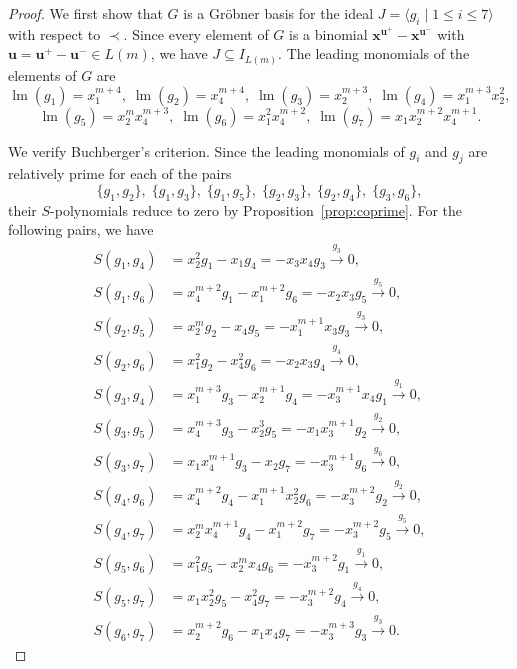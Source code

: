 \documentclass[12pt,a4paper]{amsart}
\theoremstyle{definition}
\begin{document}
\begin{proof} We first show that $G$ is a Gr\"obner basis for the ideal $J=\langle g_{i} \mid 1 \leq i \leq 7 \rangle$ with
respect to $\prec$. Since every element of $G$ is a binomial
$\mathbf x^{\mathbf u^+}-\mathbf x^{\mathbf u^-}$ with
$\mathbf u=\mathbf u^+-\mathbf u^-\in L(m)$, we have $J\subseteq I_{L(m)}$. The leading monomials of the elements of $G$ are
\[
\operatorname{lm}(g_1)=x_1^{m+4},\;
\operatorname{lm}(g_2)=x_4^{m+4},\;
\operatorname{lm}(g_3)=x_2^{m+3},\;
\operatorname{lm}(g_4)=x_1^{m+3}x_2^2, \]
\[\operatorname{lm}(g_5)=x_2^mx_4^{m+3},\;
\operatorname{lm}(g_6)=x_1^2x_4^{m+2},\;
\operatorname{lm}(g_7)=x_1x_2^{m+2}x_4^{m+1}.
\]

We verify Buchberger's criterion. Since the leading monomials of $g_i$ and $g_j$ are relatively prime for
each of the pairs
\[
\{g_1,g_2\},\;
\{g_1,g_3\},\;
\{g_1,g_5\},\;
\{g_2,g_3\},\;
\{g_2,g_4\},\;
\{g_3,g_6\},
\]
their $S$-polynomials reduce to zero by
Proposition~\ref{prop:coprime}. For the following pairs, we have
\[
\begin{aligned}
S(g_1,g_4)&=x_2^2g_1-x_1g_4=-x_3x_4g_3\stackrel{g_3}{\longrightarrow}0,\\
S(g_1,g_6)&=x_4^{m+2}g_1-x_1^{m+2}g_6=-x_2x_3g_5\stackrel{g_5}{\longrightarrow}0,\\
S(g_2,g_5)&=x_2^mg_2-x_4g_5=-x_1^{m+1}x_3g_3\stackrel{g_3}{\longrightarrow}0,\\
S(g_2,g_6)&=x_1^2g_2-x_4^2g_6=-x_2x_3g_4\stackrel{g_4}{\longrightarrow}0,\\
S(g_3,g_4)&=x_1^{m+3}g_3-x_2^{m+1}g_4=-x_3^{m+1}x_4g_1\stackrel{g_1}{\longrightarrow}0,\\
S(g_3,g_5)&=x_4^{m+3}g_3-x_2^3g_5=-x_1x_3^{m+1}g_2\stackrel{g_2}{\longrightarrow}0,\\
S(g_3,g_7)&=x_1x_4^{m+1}g_3-x_2g_7=-x_3^{m+1}g_6\stackrel{g_6}{\longrightarrow}0,\\
S(g_4,g_6)&=x_4^{m+2}g_4-x_1^{m+1}x_2^2g_6=-x_3^{m+2}g_2\stackrel{g_2}{\longrightarrow}0,\\
S(g_4,g_7)&=x_2^mx_4^{m+1}g_4-x_1^{m+2}g_7=-x_3^{m+2}g_5\stackrel{g_5}{\longrightarrow}0,\\
S(g_5,g_6)&=x_1^2g_5-x_2^mx_4g_6=-x_3^{m+2}g_1\stackrel{g_1}{\longrightarrow}0,\\
S(g_5,g_7)&=x_1x_2^2g_5-x_4^2g_7=-x_3^{m+2}g_4\stackrel{g_4}{\longrightarrow}0,\\
S(g_6,g_7)&=x_2^{m+2}g_6-x_1x_4g_7=-x_3^{m+3}g_3\stackrel{g_3}{\longrightarrow}0.
\end{aligned}
\]


\end{proof}
\end{document}
